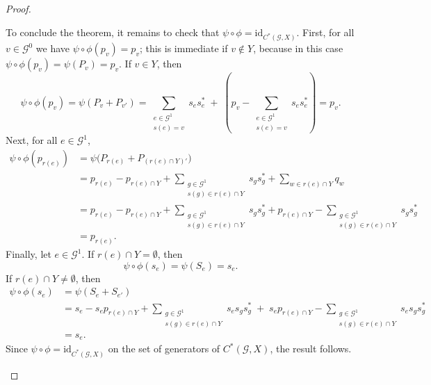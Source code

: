 \documentclass[10pt,a4paper]{amsart}
\begin{document}
\begin{proof}
\begin{enumerate}
To conclude the theorem, it remains to check that $\psi \circ \phi = \mathrm{id}_{C^*(\mathcal{G},X)}$.
First, for all $v \in \mathcal{G}^0$ we have $\psi \circ \phi(p_v) = p_v$; this is immediate if
$v \notin Y$, because in this case $\psi \circ \phi(p_v) = \psi(P_v) = p_v$. If $v \in Y$, then
\[
\psi \circ \phi(p_v)
=
\psi(P_v + P_{v'})
=
\sum_{\substack{e \in \mathcal{G}^1 \\ s(e) = v}} s_e s_e^*
\;+\;
\left( p_v - \sum_{\substack{e \in \mathcal{G}^1 \\ s(e) = v}} s_e s_e^* \right)
=
p_v.
\]
Next, for all $e \in \mathcal{G}^1$,
\begin{align*}
\psi \circ \phi(p_{r(e)})
&= \psi\big( P_{r(e)} + P_{(r(e) \cap Y)'} \big) \\
&= p_{r(e)} - p_{r(e) \cap Y}
+ \sum_{\substack{g \in \mathcal{G}^1 \\ s(g) \in r(e) \cap Y}} s_g s_g^*
+ \sum_{w \in r(e) \cap Y} q_w \\
&= p_{r(e)} - p_{r(e) \cap Y}
+ \sum_{\substack{g \in \mathcal{G}^1 \\ s(g) \in r(e) \cap Y}} s_g s_g^*
+ p_{r(e) \cap Y}
- \sum_{\substack{g \in \mathcal{G}^1 \\ s(g) \in r(e) \cap Y}} s_g s_g^* \\
&= p_{r(e)}.
\end{align*}
Finally, let $e \in \mathcal{G}^1$. If $r(e) \cap Y = \emptyset$, then
\[
\psi \circ \phi(s_e) = \psi(S_e) = s_e.
\]
If $r(e) \cap Y \neq \emptyset$, then
\begin{align*}
\psi \circ \phi(s_e)
&= \psi(S_e + S_{e'}) \\
&= s_e - s_e p_{r(e) \cap Y}
+ \sum_{\substack{g \in \mathcal{G}^1 \\ s(g) \in r(e) \cap Y}} s_e s_g s_g^*
\;+\;
s_e p_{r(e) \cap Y}
- \sum_{\substack{g \in \mathcal{G}^1 \\ s(g) \in r(e) \cap Y}} s_e s_g s_g^* \\
&= s_e.
\end{align*}
Since $\psi \circ \phi = \mathrm{id}_{C^*(\mathcal{G},X)}$ on the set of generators of
$C^*(\mathcal{G},X)$, the result follows.
\end{enumerate}
\end{proof}
\end{document}
